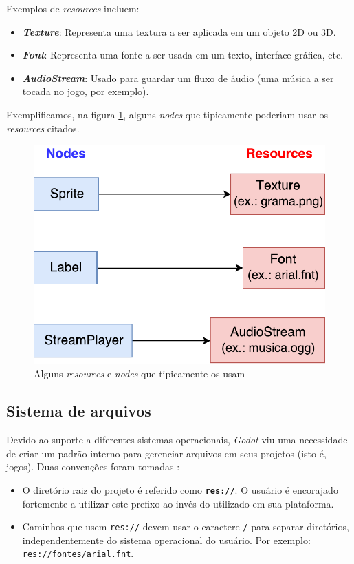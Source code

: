 Exemplos de \textit{resources} incluem:

\begin{itemize}
\item \textbf{\textit{Texture}}: Representa uma textura a ser aplicada em um objeto 2D ou 3D.

\item \textbf{\textit{Font}}: Representa uma fonte a ser usada em um texto, interface gráfica, etc.

\item \textbf{\textit{AudioStream}}: Usado para guardar um fluxo de áudio (uma música a ser tocada no jogo, por exemplo).
\end{itemize}

Exemplificamos, na figura \ref{nodeResource}, alguns \textit{nodes} que tipicamente poderiam usar os \textit{resources} citados.

\begin{figure}[H]
  \centering
  \includegraphics[width=.5\textwidth]{image/resource.pdf}
  \caption{Alguns \textit{resources} e \textit{nodes} que tipicamente os usam \citep{godotResource}}
  \label{nodeResource}
\end{figure}


\subsection{Sistema de arquivos}

Devido ao suporte a diferentes sistemas operacionais, \textit{Godot} viu uma necessidade de criar um padrão interno para gerenciar arquivos em seus projetos (isto é, jogos). Duas convenções foram tomadas \citep{godotFileSystem}:

\begin{itemize}
\item O diretório raiz do projeto é referido como \textbf{\texttt{res://}}. O usuário é encorajado fortemente a utilizar este prefixo ao invés do utilizado em sua plataforma.

\item Caminhos que usem \texttt{res://} devem usar o caractere \texttt{/} para separar diretórios, independentemente do sistema operacional do usuário. Por exemplo: \texttt{res://fontes/arial.fnt}.
\end{itemize}

